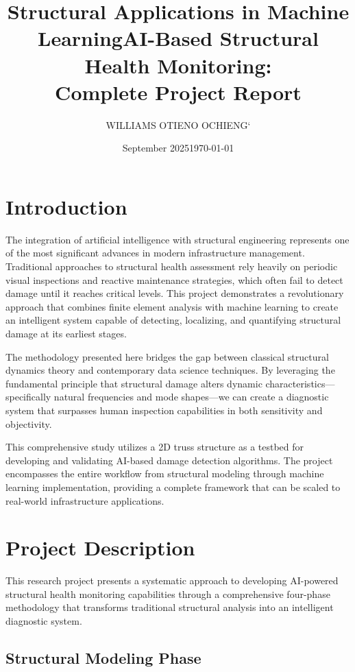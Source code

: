 \documentclass[11pt,a4paper]{article}
\title{Structural Applications in Machine Learning}
\author{WILLIAMS OTIENO OCHIENG`}
\date{September 2025}
\title{AI-Based Structural Health Monitoring: \\ Complete Project Report}
\date{\today}
\begin{document}
\maketitle


\section{Introduction}

The integration of artificial intelligence with structural engineering represents one of the most significant advances in modern infrastructure management. Traditional approaches to structural health assessment rely heavily on periodic visual inspections and reactive maintenance strategies, which often fail to detect damage until it reaches critical levels. This project demonstrates a revolutionary approach that combines finite element analysis with machine learning to create an intelligent system capable of detecting, localizing, and quantifying structural damage at its earliest stages.

The methodology presented here bridges the gap between classical structural dynamics theory and contemporary data science techniques. By leveraging the fundamental principle that structural damage alters dynamic characteristics—specifically natural frequencies and mode shapes—we can create a diagnostic system that surpasses human inspection capabilities in both sensitivity and objectivity.

This comprehensive study utilizes a 2D truss structure as a testbed for developing and validating AI-based damage detection algorithms. The project encompasses the entire workflow from structural modeling through machine learning implementation, providing a complete framework that can be scaled to real-world infrastructure applications.

\section{Project Description}

This research project presents a systematic approach to developing AI-powered structural health monitoring capabilities through a comprehensive four-phase methodology that transforms traditional structural analysis into an intelligent diagnostic system.

\subsection{Structural Modeling Phase}
\end{document}
